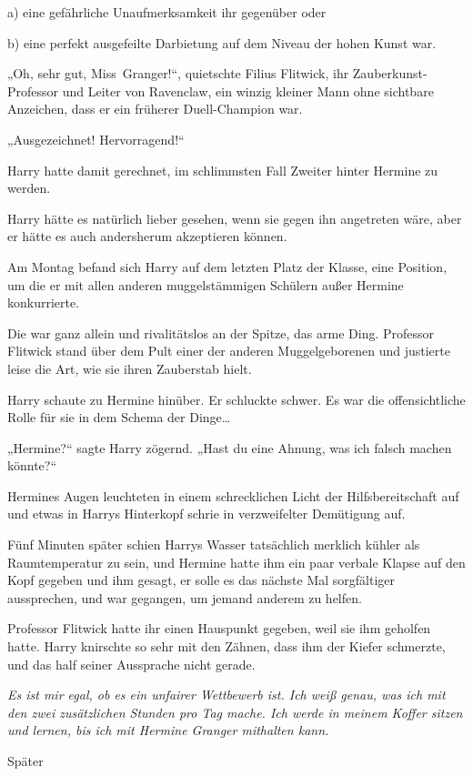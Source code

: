 {a) eine gefährliche Unaufmerksamkeit ihr gegenüber oder

b) eine perfekt ausgefeilte Darbietung auf dem Niveau der hohen Kunst war.

„Oh, sehr gut, Miss~Granger!“, quietschte Filius Flitwick, ihr Zauberkunst-Professor und Leiter von Ravenclaw, ein winzig kleiner Mann ohne sichtbare Anzeichen, dass er ein früherer Duell-Champion war.

„Ausgezeichnet! Hervorragend!“

Harry hatte damit gerechnet, im schlimmsten Fall Zweiter hinter Hermine zu werden.

Harry hätte es natürlich lieber gesehen, wenn sie gegen ihn angetreten wäre, aber er hätte es auch andersherum akzeptieren können.

Am Montag befand sich Harry auf dem letzten Platz der Klasse, eine Position, um die er mit allen anderen muggelstämmigen Schülern außer Hermine konkurrierte.

Die war ganz allein und rivalitätslos an der Spitze, das arme Ding. Professor Flitwick stand über dem Pult einer der anderen Muggelgeborenen und justierte leise die Art, wie sie ihren Zauberstab hielt.

Harry schaute zu Hermine hinüber. Er schluckte schwer. Es war die offensichtliche Rolle für sie in dem Schema der Dinge…

„Hermine?“ sagte Harry zögernd. „Hast du eine Ahnung, was ich falsch machen könnte?“

Hermines Augen leuchteten in einem schrecklichen Licht der Hilfsbereitschaft auf und etwas in Harrys Hinterkopf schrie in verzweifelter Demütigung auf.

Fünf Minuten später schien Harrys Wasser tatsächlich merklich kühler als Raumtemperatur zu sein, und Hermine hatte ihm ein paar verbale Klapse auf den Kopf gegeben und ihm gesagt, er solle es das nächste Mal sorgfältiger aussprechen, und war gegangen, um jemand anderem zu helfen.

Professor Flitwick hatte ihr einen Hauspunkt gegeben, weil sie ihm geholfen hatte. Harry knirschte so sehr mit den Zähnen, dass ihm der Kiefer schmerzte, und das half seiner Aussprache nicht gerade.

\emph{Es ist mir egal, ob es ein unfairer Wettbewerb ist. Ich weiß genau, was ich mit den zwei zusätzlichen Stunden pro Tag mache. Ich werde in meinem Koffer sitzen und lernen, bis ich mit Hermine Granger mithalten kann.}

Später

}
